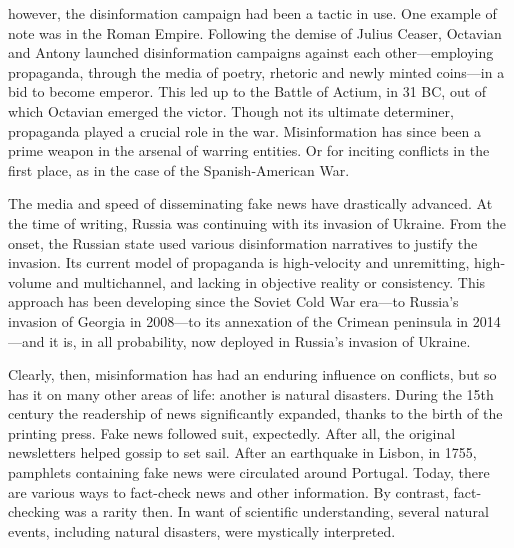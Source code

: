  however, the disinformation campaign had been a tactic in use. One example of note was in the Roman Empire. Following the demise of Julius Ceaser, Octavian and Antony launched disinformation campaigns against each other—employing propaganda, through the media of poetry, rhetoric and newly minted coins—in a bid to become emperor. This led up to the Battle of Actium, in 31 BC, out of which Octavian emerged the victor. Though not its ultimate determiner, propaganda played a crucial role in the war. Misinformation has since been a prime weapon in the arsenal of warring entities. Or for inciting conflicts in the first place, as in the case of the Spanish-American War.

The media and speed of disseminating fake news have drastically advanced. At the time of writing, Russia was continuing with its invasion of Ukraine. From the onset, the Russian state used various disinformation narratives to justify the invasion. Its current model of propaganda is high-velocity and unremitting, high-volume and multichannel, and lacking in objective reality or consistency. This approach has been developing since the Soviet Cold War era—to Russia's invasion of Georgia in 2008—to its annexation of the Crimean peninsula in 2014—and it is, in all probability, now deployed in Russia's invasion of Ukraine.

Clearly, then, misinformation has had an enduring influence on conflicts, but so has it on many other areas of life: another is natural disasters. During the 15th century the readership of news significantly expanded, thanks to the birth of the printing press. Fake news followed suit, expectedly. After all, the original newsletters helped gossip to set sail. After an earthquake in Lisbon, in 1755, pamphlets containing fake news were circulated around Portugal. Today, there are various ways to fact-check news and other information. By contrast, fact-checking was a rarity then. In want of scientific understanding, several natural events, including natural disasters, were mystically interpreted.

